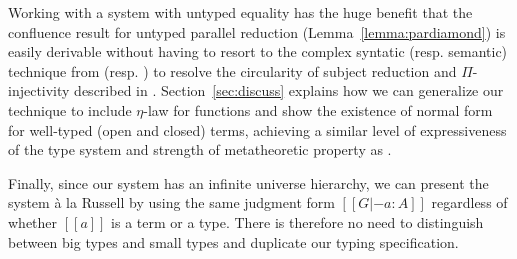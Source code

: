 \documentclass[acmsmall]{acmart}
\newcommand{\lang}{$\lambda^H$\xspace}
\begin{document}
Working with a system with untyped equality has the huge benefit that
the confluence result for untyped parallel reduction
(Lemma~\ref{lemma:pardiamond}) is easily derivable without having to
resort to the complex syntatic (resp. semantic) technique from
\citet{siles2012pure} (resp. \citet{decagda}) to resolve
the circularity of subject reduction and $\Pi$-injectivity described
in \citet{siles2012pure}. Section~\ref{sec:discuss} explains how we
can generalize our technique to include $\eta$-law for functions and
show the existence of normal form for well-typed (open and closed)
terms, achieving a similar level of expressiveness of the type system
and strength of metatheoretic property as \citet{decagda}.

Finally, since our system has an infinite universe hierarchy, we can
present the system à la Russell by using the same judgment form $[[G
|- a : A]]$ regardless of whether $[[a]]$ is a term or a type. There
is therefore no need to distinguish between big types and small types
and duplicate our typing specification.














\end{document}
